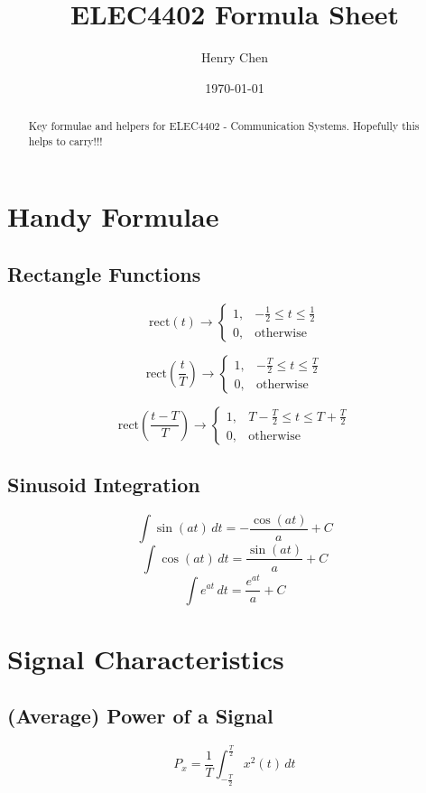 \documentclass[12pt]{article}
\title{ELEC4402 Formula Sheet}
\author{Henry Chen}
\date{\today}
\begin{document}
\maketitle

\begin{abstract}
    Key formulae and helpers for ELEC4402 - Communication Systems. Hopefully this helps to carry!!!
\end{abstract}

\tableofcontents
\newpage

\section{Handy Formulae}
\subsection{Rectangle Functions}
\[
	\text{rect}(t) \rightarrow
	\begin{cases}
		1, & -\frac{1}{2} \leq t \leq \frac{1}{2} \\
		0, & \text{otherwise}
	\end{cases}
\]

\[
	\text{rect}\left(\frac{t}{T}\right) \rightarrow
	\begin{cases}
		1, & -\frac{T}{2} \leq t \leq \frac{T}{2} \\
		0, & \text{otherwise}
	\end{cases}
\]

\[
	\text{rect}\left(\frac{t - T}{T}\right) \rightarrow
	\begin{cases}
		1, & T - \frac{T}{2} \leq t \leq T + \frac{T}{2} \\
		0, & \text{otherwise}
	\end{cases}
\]

\subsection{Sinusoid Integration}
\[
	\int \sin(at) \, dt = -\frac{\cos(at)}{a} + C
\]
\[
	\int \cos(at) \, dt = \frac{\sin(at)}{a} + C
\]
\[
	\int e^{at} \, dt = \frac{e^{at}}{a} + C
\]

\section{Signal Characteristics}
\subsection{(Average) Power of a Signal}
$$
	P_x = \frac{1}{T} \int_{-\frac{T}{2}}^{\frac{T}{2}} x^2(t) \, dt
$$
\end{document}
